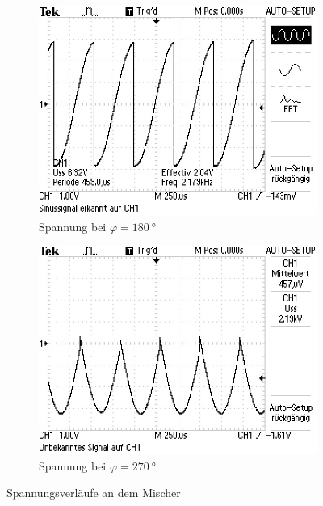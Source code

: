 \begin{figure}[h!]
 \centering
 \begin{subfigure}{0.48\textwidth}
  \centering
  \includegraphics[width=\textwidth]{180gradnormal.JPG}
  \caption{Spannung bei $\varphi=\SI{180}{°}$}
  \label{fig:180gradnormal}
 \end{subfigure}
 \begin{subfigure}{0.48\textwidth}
  \centering
  \includegraphics[width=\textwidth]{270gradnormal.JPG}
  \caption{Spannung bei $\varphi=\SI{270}{°}$}
  \label{fig:270gradnormal}
 \end{subfigure}
 \caption{Spannungsverläufe an dem Mischer}
 \label{fig:180270}
\end{figure}
